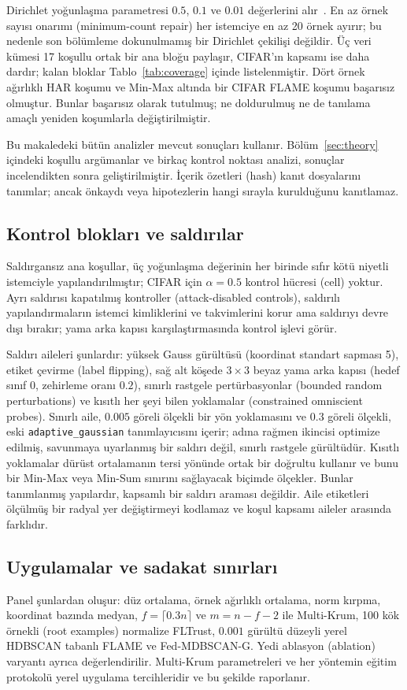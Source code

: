 \documentclass[journal]{IEEEtran}
\newcommand{\method}{Fed-MDBSCAN-G}
\begin{document}
Dirichlet yoğunlaşma parametresi $0.5$, $0.1$ ve $0.01$ değerlerini alır~\cite{hsu2019}. En az örnek sayısı onarımı (minimum-count repair) her istemciye en az 20 örnek ayırır; bu nedenle son bölümleme dokunulmamış bir Dirichlet çekilişi değildir. Üç veri kümesi 17 koşullu ortak bir ana bloğu paylaşır, CIFAR'ın kapsamı ise daha dardır; kalan bloklar Tablo~\ref{tab:coverage} içinde listelenmiştir. Dört örnek ağırlıklı HAR koşumu ve Min-Max altında bir CIFAR FLAME koşumu başarısız olmuştur. Bunlar başarısız olarak tutulmuş; ne doldurulmuş ne de tanılama amaçlı yeniden koşumlarla değiştirilmiştir.

Bu makaledeki bütün analizler mevcut sonuçları kullanır. Bölüm~\ref{sec:theory} içindeki koşullu argümanlar ve birkaç kontrol noktası analizi, sonuçlar incelendikten sonra geliştirilmiştir. İçerik özetleri (hash) kanıt dosyalarını tanımlar; ancak önkaydı veya hipotezlerin hangi sırayla kurulduğunu kanıtlamaz.

\subsection{Kontrol blokları ve saldırılar}
Saldırgansız ana koşullar, üç yoğunlaşma değerinin her birinde sıfır kötü niyetli istemciyle yapılandırılmıştır; CIFAR için $\alpha=0.5$ kontrol hücresi (cell) yoktur. Ayrı saldırısı kapatılmış kontroller (attack-disabled controls), saldırılı yapılandırmaların istemci kimliklerini ve takvimlerini korur ama saldırıyı devre dışı bırakır; yama arka kapısı karşılaştırmasında kontrol işlevi görür.

Saldırı aileleri şunlardır: yüksek Gauss gürültüsü (koordinat standart sapması 5), etiket çevirme (label flipping), sağ alt köşede $3\times3$ beyaz yama arka kapısı (hedef sınıf 0, zehirleme oranı $0.2$), sınırlı rastgele pertürbasyonlar (bounded random perturbations) ve kısıtlı her şeyi bilen yoklamalar (constrained omniscient probes). Sınırlı aile, $0.005$ göreli ölçekli bir yön yoklamasını ve $0.3$ göreli ölçekli, eski \texttt{adaptive\_gaussian} tanımlayıcısını içerir; adına rağmen ikincisi optimize edilmiş, savunmaya uyarlanmış bir saldırı değil, sınırlı rastgele gürültüdür. Kısıtlı yoklamalar dürüst ortalamanın tersi yönünde ortak bir doğrultu kullanır ve bunu bir Min-Max veya Min-Sum sınırını sağlayacak biçimde ölçekler. Bunlar tanımlanmış yapılardır, kapsamlı bir saldırı araması değildir. Aile etiketleri ölçülmüş bir radyal yer değiştirmeyi kodlamaz ve koşul kapsamı aileler arasında farklıdır.

\subsection{Uygulamalar ve sadakat sınırları}\label{sec:fidelity}
Panel şunlardan oluşur: düz ortalama, örnek ağırlıklı ortalama, norm kırpma, koordinat bazında medyan, $f=\lceil0.3n\rceil$ ve $m=n-f-2$ ile Multi-Krum, 100 kök örnekli (root examples) normalize FLTrust, $0.001$ gürültü düzeyli yerel HDBSCAN tabanlı FLAME ve \method{}. Yedi ablasyon (ablation) varyantı ayrıca değerlendirilir. Multi-Krum parametreleri ve her yöntemin eğitim protokolü yerel uygulama tercihleridir ve bu şekilde raporlanır.
\end{document}
